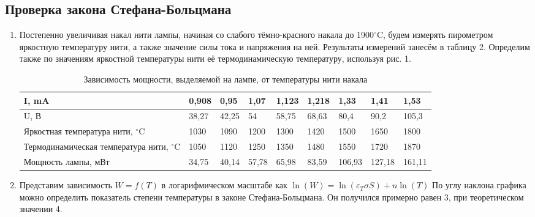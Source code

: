 \documentclass[a4paper]{article}
\begin{document}
\subsection{Проверка закона Стефана-Больцмана}
\begin{enumerate}
    \item Постепенно увеличивая накал нити лампы, начиная со слабого тёмно-красного накала до 1900$^{\circ}$C, будем измерять пирометром яркостную температуру нити, а также значение силы тока и напряжения на ней. Результаты измерений занесём в таблицу 2. Определим также по значениям яркостной температуры нити её термодинамическую температуру, используя рис. 1.
    
    \begin{table}[h]
    \centering
    \begin{center}
    \caption{Зависимость мощности, выделяемой на лампе, от температуры нити накала}
    \end{center}
    \vspace{0.1cm}
    \label{tab:my_label}
    \begin{tabular}{ |p{4.5cm}||p{1cm}|p{1cm}|p{1cm}|p{1cm}|p{1cm}|p{1cm}|p{1cm}|p{1cm}|}
 \hline
 I, mA & 0,908 & 0,95 & 1,07 & 1,123 & 1,218 & 1,33 & 1,41 & 1,53
\\
\hline
U, В & 38,27 & 42,25 & 54 & 58,75 & 68,63 & 80,4 & 90,2 & 105,3
 \\
 \hline
 Яркостная температура нити, $^{\circ}$C & 1030 & 1090 & 1200 & 1300 & 1420 & 1500 & 1650 & 1800
 \\
 \hline
 Термодинамическая температура нити, $^{\circ}$C & 1050 & 1120 & 1250 & 1350 & 1480 & 1550 & 1720 & 1870
\\
  \hline
 Мощность лампы, мВт & 34,75 & 40,14 & 57,78 & 65,98 & 83,59 & 106,93 & 127,18 & 161,11
 \\
 \hline
\end{tabular}
\end{table}   

\item Представим зависимость $W=f(T)$ в логарифмическом масштабе как $\ln(W) = \ln(\varepsilon_T \sigma S) + n \ln(T)$ По углу наклона графика можно определить показатель степени температуры в законе Стефана-Больцмана. Он получился примерно равен 3, при теоретическом значении 4. 


\end{enumerate}
\end{document}
